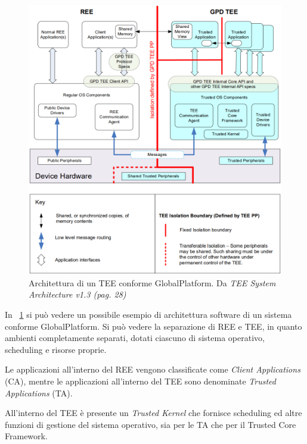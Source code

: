 \documentclass[12pt,italian]{report}
\begin{document}
	\begin{figure}
		\centering
		\includegraphics[width=1\textwidth]{immagini/TEE_SW_Architecture}
		\caption{
			Architettura di un TEE conforme GlobalPlatform. 
			Da \textit{TEE System Architecture v1.3 (pag. 28)}
			\cite{gp2020systemarchitecture}
		}
		\label{fig:tee-architecture}
	\end{figure}
	
	\bigbreak
	
	In \figurename~\ref{fig:tee-architecture} si può vedere un possibile esempio di architettura software di un sistema conforme GlobalPlatform. Si può vedere la separazione di REE e TEE, in quanto ambienti completamente separati, dotati ciascuno di sistema operativo, scheduling e risorse proprie.
	
	Le applicazioni all'interno del REE vengono classificate come \textit{Client Applications} (CA), mentre le applicazioni all'interno del TEE sono denominate \textit{Trusted Applications} (TA).
	
	All'interno del TEE è presente un \textit{Trusted Kernel} che fornisce scheduling ed altre funzioni di gestione del sistema operativo, sia per le TA che per il Trusted Core Framework.
	
	\bigbreak
	
\end{document}
